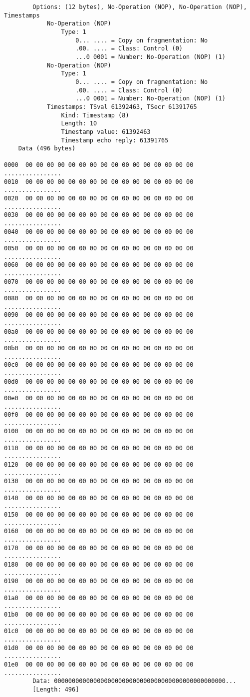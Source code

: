 \begin{lstlisting}
        Options: (12 bytes), No-Operation (NOP), No-Operation (NOP), Timestamps
            No-Operation (NOP)
                Type: 1
                    0... .... = Copy on fragmentation: No
                    .00. .... = Class: Control (0)
                    ...0 0001 = Number: No-Operation (NOP) (1)
            No-Operation (NOP)
                Type: 1
                    0... .... = Copy on fragmentation: No
                    .00. .... = Class: Control (0)
                    ...0 0001 = Number: No-Operation (NOP) (1)
            Timestamps: TSval 61392463, TSecr 61391765
                Kind: Timestamp (8)
                Length: 10
                Timestamp value: 61392463
                Timestamp echo reply: 61391765
    Data (496 bytes)

0000  00 00 00 00 00 00 00 00 00 00 00 00 00 00 00 00   ................
0010  00 00 00 00 00 00 00 00 00 00 00 00 00 00 00 00   ................
0020  00 00 00 00 00 00 00 00 00 00 00 00 00 00 00 00   ................
0030  00 00 00 00 00 00 00 00 00 00 00 00 00 00 00 00   ................
0040  00 00 00 00 00 00 00 00 00 00 00 00 00 00 00 00   ................
0050  00 00 00 00 00 00 00 00 00 00 00 00 00 00 00 00   ................
0060  00 00 00 00 00 00 00 00 00 00 00 00 00 00 00 00   ................
0070  00 00 00 00 00 00 00 00 00 00 00 00 00 00 00 00   ................
0080  00 00 00 00 00 00 00 00 00 00 00 00 00 00 00 00   ................
0090  00 00 00 00 00 00 00 00 00 00 00 00 00 00 00 00   ................
00a0  00 00 00 00 00 00 00 00 00 00 00 00 00 00 00 00   ................
00b0  00 00 00 00 00 00 00 00 00 00 00 00 00 00 00 00   ................
00c0  00 00 00 00 00 00 00 00 00 00 00 00 00 00 00 00   ................
00d0  00 00 00 00 00 00 00 00 00 00 00 00 00 00 00 00   ................
00e0  00 00 00 00 00 00 00 00 00 00 00 00 00 00 00 00   ................
00f0  00 00 00 00 00 00 00 00 00 00 00 00 00 00 00 00   ................
0100  00 00 00 00 00 00 00 00 00 00 00 00 00 00 00 00   ................
0110  00 00 00 00 00 00 00 00 00 00 00 00 00 00 00 00   ................
0120  00 00 00 00 00 00 00 00 00 00 00 00 00 00 00 00   ................
0130  00 00 00 00 00 00 00 00 00 00 00 00 00 00 00 00   ................
0140  00 00 00 00 00 00 00 00 00 00 00 00 00 00 00 00   ................
0150  00 00 00 00 00 00 00 00 00 00 00 00 00 00 00 00   ................
0160  00 00 00 00 00 00 00 00 00 00 00 00 00 00 00 00   ................
0170  00 00 00 00 00 00 00 00 00 00 00 00 00 00 00 00   ................
0180  00 00 00 00 00 00 00 00 00 00 00 00 00 00 00 00   ................
0190  00 00 00 00 00 00 00 00 00 00 00 00 00 00 00 00   ................
01a0  00 00 00 00 00 00 00 00 00 00 00 00 00 00 00 00   ................
01b0  00 00 00 00 00 00 00 00 00 00 00 00 00 00 00 00   ................
01c0  00 00 00 00 00 00 00 00 00 00 00 00 00 00 00 00   ................
01d0  00 00 00 00 00 00 00 00 00 00 00 00 00 00 00 00   ................
01e0  00 00 00 00 00 00 00 00 00 00 00 00 00 00 00 00   ................
        Data: 000000000000000000000000000000000000000000000000...
        [Length: 496]
\end{lstlisting}


